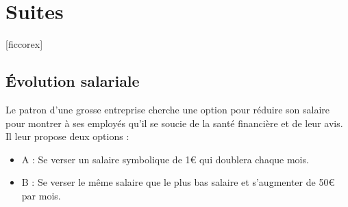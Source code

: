 \documentclass[12pt,a4paper,oneside,dvipsnames,table,svgnames,skins,theorems]{report}
\author{Devoir type CCF} %
\begin{document}
\setcounter{chapter}{2}

\chapter{ Suites  }





[ficcorex]

\vspace{-1cm}
\section*{Évolution salariale}

Le patron d'une grosse entreprise cherche une option pour réduire son salaire pour montrer à ses employés qu'il se soucie de la santé financière et de leur avis. Il leur propose deux options :

\begin{itemize}
\item A : Se verser un salaire symbolique de 1\euro{} qui doublera chaque mois.
\item B : Se verser le même salaire que le plus bas salaire et s'augmenter de 50\euro{} par mois.
\end{itemize}






\end{document}
